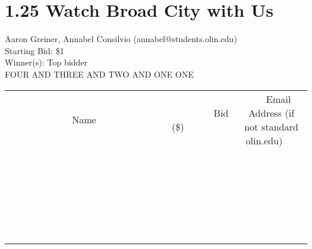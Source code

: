 \documentclass[11pt]{article}
\begin{document}
\section*{1.25 Watch Broad City with Us}
Aaron Greiner, Annabel Consilvio (annabel@students.olin.edu) \\
Starting Bid: \$1 \\
Winner(s): 
Top bidder \\
FOUR AND THREE AND TWO AND ONE ONE \\[6ex]
\begin{tabular}{c c c}
~~~~~~~~~~~~~Name~~~~~~~~~~~~~ & ~~~~~~~~~Bid (\$)~~~~~~~~~ & ~~~Email Address (if not standard olin.edu)~~~ \\
 & & \\
\hline
 & & \\
\hline
 & & \\
\hline
 & & \\
\hline
 & & \\
\hline
 & & \\
\hline
 & & \\
\hline
 & & \\
\hline
 & & \\
\hline
 & & \\
\hline
 & & \\
\hline
 & & \\
\hline
 & & \\
\hline
 & & \\
\hline
 & & \\
\hline
 & & \\
\hline
 & & \\
\hline
 & & \\
\hline
 & & \\
\hline
 & & \\
\hline
 & & \\
\hline
 & & \\
\hline
 & & \\
\hline
 & & \\
\hline
 & & \\
\hline
 & & \\
\hline
\end{tabular}
\clearpage
\end{document}
